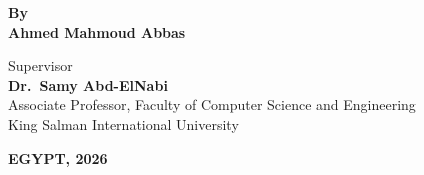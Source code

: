 \begin{titlepage}
\begin{center}
\vspace{0.4cm}

{\normalsize\bfseries By}\\[6pt]
{\large\bfseries Ahmed Mahmoud Abbas}

\vspace{0.4cm}

{\normalsize Supervisor}\\[4pt]
{\large\bfseries Dr.\ Samy Abd-ElNabi}\\[3pt]
{\small
  Associate Professor, Faculty of Computer Science and Engineering\\
  King Salman International University
}

\vfill

{\normalsize\bfseries EGYPT, 2026}

\end{center}
\end{titlepage}
\nopagecolor
\restoregeometry
